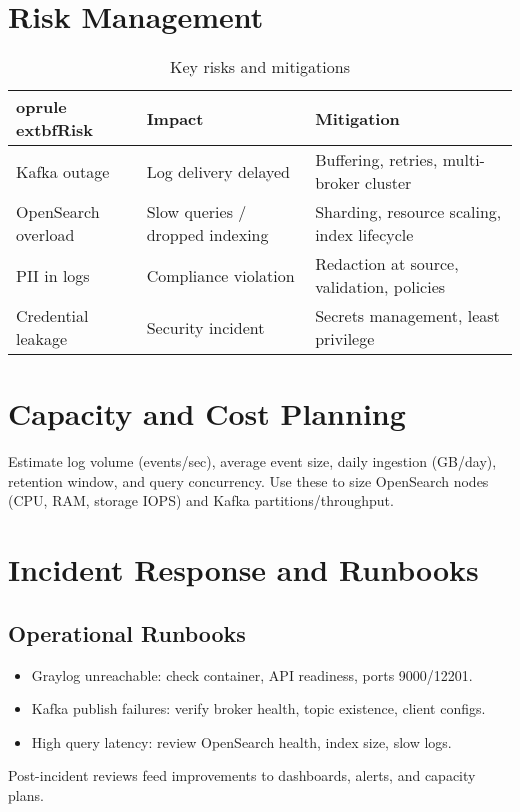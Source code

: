 \documentclass[12pt,a4paper]{report}
\begin{document}
\chapter{Risk Management}
\begin{table}[H]
\centering
\begin{tabular}{p{3.5cm} p{6.5cm} p{4.5cm}}
	oprule
	extbf{Risk} & \textbf{Impact} & \textbf{Mitigation} \\
\midrule
Kafka outage & Log delivery delayed & Buffering, retries, multi-broker cluster \\
OpenSearch overload & Slow queries / dropped indexing & Sharding, resource scaling, index lifecycle \\
PII in logs & Compliance violation & Redaction at source, validation, policies \\
Credential leakage & Security incident & Secrets management, least privilege \\
\bottomrule
\end{tabular}
\caption{Key risks and mitigations}
\end{table}

\chapter{Capacity and Cost Planning}
Estimate log volume (events/sec), average event size, daily ingestion (GB/day), retention window, and query concurrency. Use these to size OpenSearch nodes (CPU, RAM, storage IOPS) and Kafka partitions/throughput.

\chapter{Incident Response and Runbooks}
\section{Operational Runbooks}
\begin{itemize}[leftmargin=1.2cm]
  \item Graylog unreachable: check container, API readiness, ports 9000/12201.
  \item Kafka publish failures: verify broker health, topic existence, client configs.
  \item High query latency: review OpenSearch health, index size, slow logs.
\end{itemize}
Post-incident reviews feed improvements to dashboards, alerts, and capacity plans.
\end{document}
